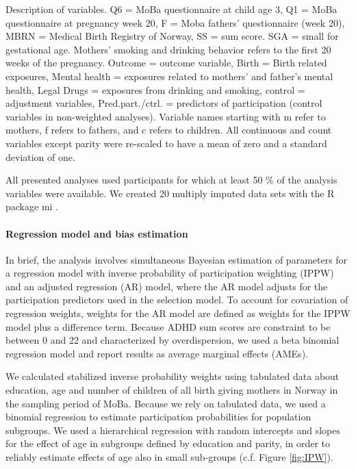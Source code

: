 \documentclass[12pt]{article}
\begin{document}
\begin{table}[ht]
	\centering
	\caption{Description of variables.
		\newline Q6 = MoBa questionnaire at child age 3, Q1 =  MoBa questionnaire at pregnancy week 20, F = Moba fathers' questionnaire (week 20), MBRN = Medical Birth Registry of Norway, SS = sum score. SGA = small for gestational age. Mothers' smoking and drinking behavior refers to the first 20 weeks of the pregnancy. 
		\newline Outcome = outcome variable, Birth = Birth related exposures, Mental health = exposures related to mothers' and father's mental health, Legal Drugs = exposures from drinking and smoking, control = adjustment variables, Pred.part./ctrl. = predictors of participation (control variables in non-weighted analyses).
		Variable names starting with m refer to mothers, f refers to fathers, and c refers to children. All continuous and count variables except parity were re-scaled to have a mean of zero and a standard deviation of one.} 
	\label{table:variables}
\end{table}


All presented analyses used participants for which at least 50 \% of the analysis variables were available. We created 20 multiply imputed data sets with the R package mi \cite{Su2011-he}. 

\paragraph{Regression model and bias estimation}

In brief, the analysis involves simultaneous Bayesian estimation of parameters for a regression model with inverse probability of participation weighting (IPPW) and an adjusted regression (AR) model, where the AR model adjusts for the participation predictors used in the selection model. To account for covariation of regression weights, weights for the AR model are defined as  weights for the IPPW model plus a difference term. Because ADHD sum scores are constraint to be between 0 and 22 and characterized by overdispersion, we used a beta binomial regression model and report results as average marginal effects (AMEs). 


We calculated stabilized inverse probability weights using tabulated data about education, age and number of children of all birth giving mothers in Norway in the sampling period of MoBa. Because we rely on tabulated data, we used a binomial regression to estimate participation probabilities for population subgroups. We used a hierarchical regression with random intercepts and slopes for the effect of age in subgroups defined by education and parity, in order to reliably estimate effects of age also in small sub-groups (c.f. Figure \ref{fig:IPW}).
\end{document}
